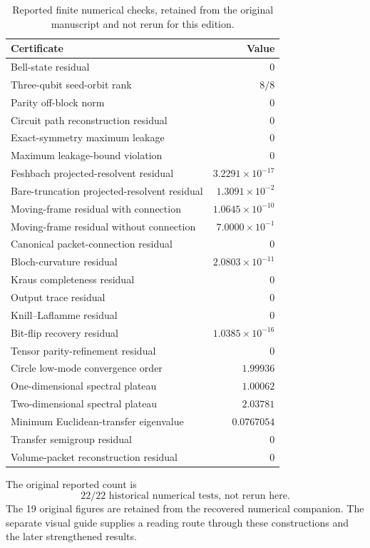 \begin{table}[htbp]
\centering
\caption{Reported finite numerical checks, retained from the original manuscript and not rerun for this edition.}
\label{core:tab:certificates}
\begin{tabular}{L{0.64\textwidth}r}
\toprule
Certificate & Value\\
\midrule
Bell-state residual & $0$\\
Three-qubit seed-orbit rank & $8/8$\\
Parity off-block norm & $0$\\
Circuit path reconstruction residual & $0$\\
Exact-symmetry maximum leakage & $0$\\
Maximum leakage-bound violation & $0$\\
Feshbach projected-resolvent residual & $3.2291\times10^{-17}$\\
Bare-truncation projected-resolvent residual & $1.3091\times10^{-2}$\\
Moving-frame residual with connection & $1.0645\times10^{-10}$\\
Moving-frame residual without connection & $7.0000\times10^{-1}$\\
Canonical packet-connection residual & $0$\\
Bloch-curvature residual & $2.0803\times10^{-11}$\\
Kraus completeness residual & $0$\\
Output trace residual & $0$\\
Knill--Laflamme residual & $0$\\
Bit-flip recovery residual & $1.0385\times10^{-16}$\\
Tensor parity-refinement residual & $0$\\
Circle low-mode convergence order & $1.99936$\\
One-dimensional spectral plateau & $1.00062$\\
Two-dimensional spectral plateau & $2.03781$\\
Minimum Euclidean-transfer eigenvalue & $0.0767054$\\
Transfer semigroup residual & $0$\\
Volume-packet reconstruction residual & $0$\\
\bottomrule
\end{tabular}
\end{table}

The original reported count is
\[
\boxed{22/22\text{ historical numerical tests, not rerun here}.}
\]
The 19 original figures are retained from the recovered numerical companion. The separate visual guide supplies a reading route through these constructions and the later strengthened results.

